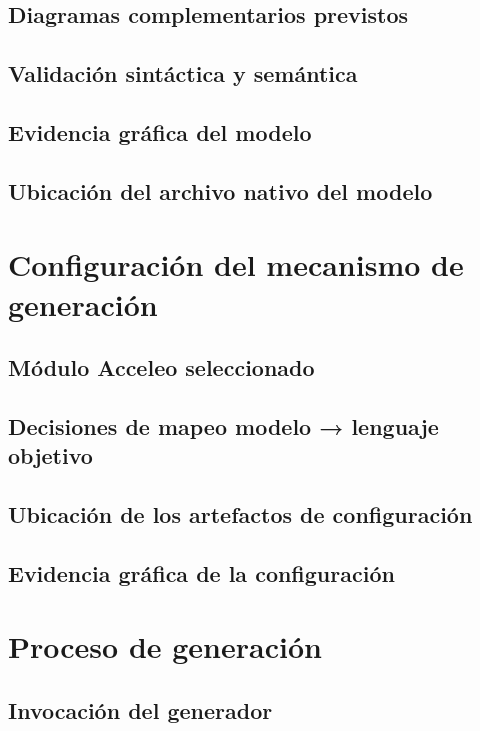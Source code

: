 \documentclass[11pt,a4paper]{article}
\begin{document}
\subsection{Diagramas complementarios previstos}

\subsection{Validación sintáctica y semántica}

\subsection{Evidencia gráfica del modelo}

\subsection{Ubicación del archivo nativo del modelo}

\section{Configuración del mecanismo de generación}
\label{sec:configuracion_generador}

\subsection{Módulo Acceleo seleccionado}

\subsection{Decisiones de mapeo modelo → lenguaje objetivo}

\subsection{Ubicación de los artefactos de configuración}

\subsection{Evidencia gráfica de la configuración}

\section{Proceso de generación}

\subsection{Invocación del generador}
\end{document}

